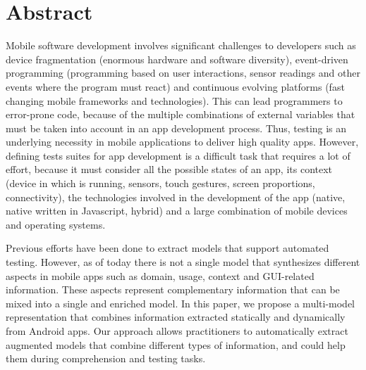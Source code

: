 %
\chapter*{Abstract}
\label{sec:abstract}
\vspace*{-10mm}
Mobile software development involves significant challenges to developers such as device fragmentation (\ie enormous hardware and software diversity), event-driven programming (\ie programming based on user interactions, sensor readings and other events where the program must react) and continuous evolving platforms (\ie fast changing mobile frameworks and technologies). This can lead programmers to error-prone code, because of the multiple combinations of external variables that must be taken into account in an app development process. Thus, testing is an underlying necessity in mobile applications to deliver high quality apps. However, defining tests suites for app development is a difficult task that requires a lot of effort, because it must consider all the possible states of an app, its context (\eg device in which is running, sensors, touch gestures, screen proportions, connectivity), the technologies involved in the development of the app (\eg native, native written in Javascript, hybrid) and a large combination of mobile devices and operating systems.

Previous efforts have been done to extract models that support automated testing. However, as of today there is not a single model that synthesizes different aspects in mobile apps such as domain, usage, context and GUI-related information. These aspects represent complementary information that can be mixed into a single and enriched model. In this paper, we propose a multi-model representation that combines information extracted statically and dynamically from Android apps. Our approach allows practitioners to automatically extract augmented models that combine different types of information, and could help them during comprehension and testing tasks.

\vspace*{20mm}
